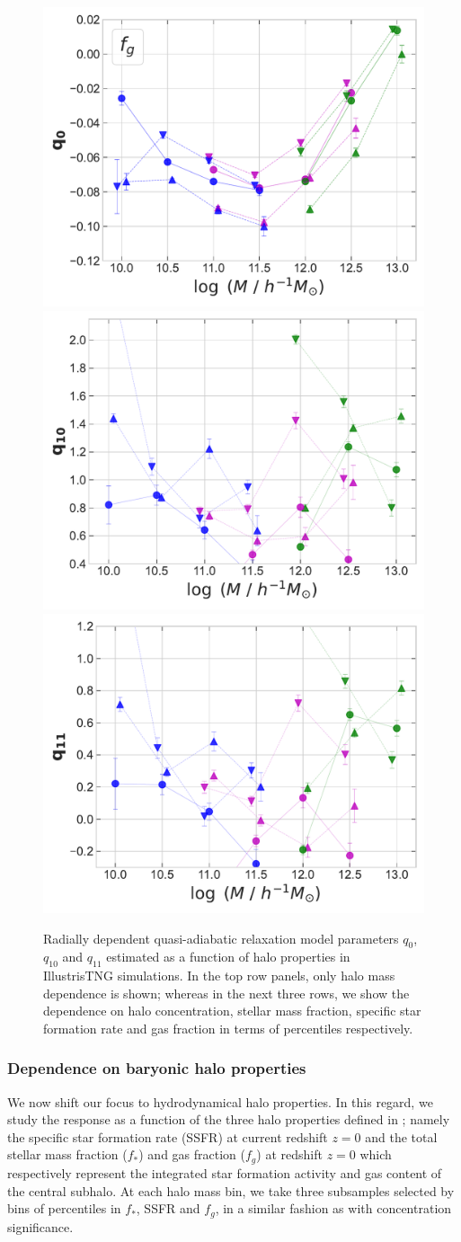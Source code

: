 \begin{figure}
    \includegraphics[width=0.32\linewidth]{plots/fit_param_q0_M-fg_T.pdf}
    \includegraphics[width=0.32\linewidth]{plots/fit_param_q10_M-fg_T.pdf}
    \includegraphics[width=0.32\linewidth]{plots/fit_param_q11_M-fg_T.pdf}
    \caption{Radially dependent quasi-adiabatic relaxation model parameters $q_{0}$, $q_{10}$ and $q_{11}$ estimated as a function of halo properties in IllustrisTNG simulations. In the top row panels, only halo mass dependence is shown; whereas in the next three rows, we show the dependence on halo concentration, stellar mass fraction, specific star formation rate and gas fraction in terms of percentiles respectively.} %
    \label{fig:fit-fit-func-q-ch:simbase}
\end{figure}


\subsubsection{Dependence on baryonic halo properties}
We now shift our focus to hydrodynamical halo properties. In this regard, we study the response as a function of the three halo properties defined in ; namely the specific star formation rate (SSFR) at current redshift $z=0$ and the total stellar mass fraction ($f_{\ast}$) and gas fraction ($f_g$) at redshift $z=0$ which respectively represent the integrated star formation activity and gas content of the central subhalo. At each halo mass bin, we take three subsamples selected by bins of percentiles in $f_{\ast}$, SSFR and $f_g$, in a similar fashion as with concentration significance. %

